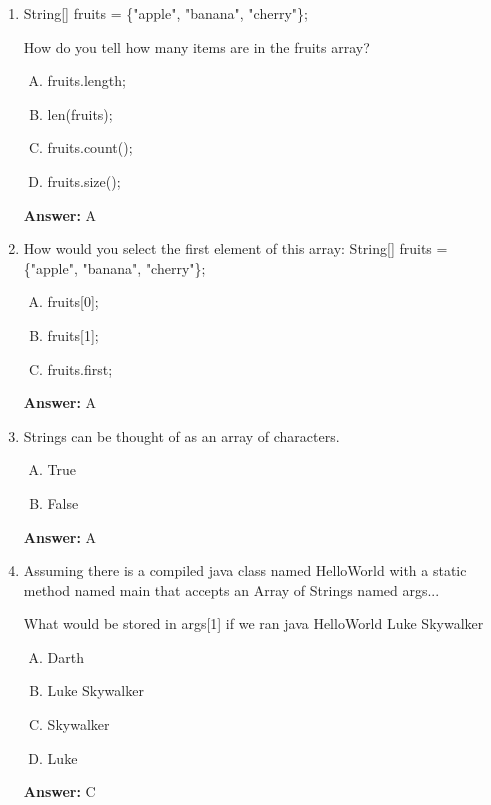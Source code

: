 \documentclass[12pt]{article}
\begin{document}
\begin{enumerate}[1.]
    \item

    String[] fruits = \{"apple", "banana", "cherry"\};

    How do you tell how many items are in the fruits array?

    \bigskip

    \begin{enumerate}[A.]
        \item fruits.length;
        \item len(fruits);
        \item fruits.count();
        \item fruits.size();
    \end{enumerate}

    \bigskip

    \textbf{Answer:} A

    \item

    How would you select the first element of this array: String[] fruits =
    \{"apple", "banana", "cherry"\};

    \bigskip

    \begin{enumerate}[A.]
        \item fruits[0];
        \item fruits[1];
        \item fruits.first;
    \end{enumerate}

    \bigskip

    \textbf{Answer:} A

    \item Strings can be thought of as an array of characters.

    \bigskip

    \begin{enumerate}[A.]
        \item True
        \item False
    \end{enumerate}

    \bigskip

    \textbf{Answer:} A

    \item Assuming there is a compiled java class named HelloWorld with a static
    method named main that accepts an Array of Strings named args...

    \bigskip

    What would be stored in args[1] if we ran java HelloWorld Luke Skywalker

    \bigskip

    \begin{enumerate}[A.]
        \item Darth
        \item Luke Skywalker
        \item Skywalker
        \item Luke
    \end{enumerate}

    \bigskip

    \textbf{Answer:} C

\end{enumerate}
\end{document}
